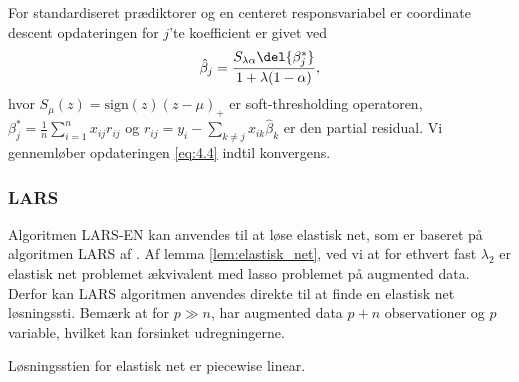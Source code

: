 For standardiseret prædiktorer og en centeret responsvariabel er coordinate descent opdateringen for $j$'te koefficient er givet ved
\begin{align}
\hat{\beta}_j = \frac{S_{\lambda \alpha} \del{\beta_j^*}}{1 + \lambda (1-\alpha)}, \label{eq:4.4}
\end{align}
hvor $S_\mu(z)=\text{sign}(z)(z-\mu)_+$ er soft-thresholding operatoren, \(\beta_j^* = \frac{1}{n} \sum_{i=1}^n x_{ij} r_{ij}\) og $r_{ij}=y_i - \sum_{k \neq j} x_{ik} \hat{\beta}_k$ er den partial residual. 
Vi gennemløber opdateringen \eqref{eq:4.4} indtil konvergens.

%


\subsubsection{LARS}
Algoritmen LARS-EN kan anvendes til at løse elastisk net, som er baseret på algoritmen LARS af \cite{efron}.
Af lemma \ref{lem:elastisk_net}, ved vi at for ethvert fast \(\lambda_2\) er elastisk net problemet ækvivalent med lasso problemet på augmented data.
Derfor kan LARS algoritmen anvendes direkte til at finde en elastisk net løsningssti.
Bemærk at for \(p \gg n\), har augmented data \(p+n\) observationer og \(p\) variable, hvilket kan forsinket udregningerne.


Løsningsstien for elastisk net er piecewise linear.
\newpage
